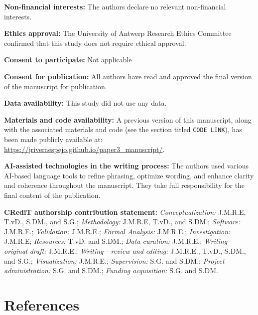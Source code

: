 \documentclass[
  authoryear,
  review,
  1p]{elsarticle}
\begin{document}
\textbf{Non-financial interests:} The authors declare no relevant
non-financial interests.

\textbf{Ethics approval:} The University of Antwerp Research Ethics
Committee confirmed that this study does not require ethical approval.

\textbf{Consent to participate:} Not applicable

\textbf{Consent for publication:} All authors have read and approved the
final version of the manuscript for publication.

\textbf{Data availability:} This study did not use any data.

\textbf{Materials and code availability:} A previous version of this
manuscript, along with the associated materials and code (see the
section titled \texttt{CODE\ LINK}), has been made publicly available
at: \url{https://jriveraespejo.github.io/paper3_manuscript/}.

\textbf{AI-assisted technologies in the writing process:} The authors
used various AI-based language tools to refine phrasing, optimize
wording, and enhance clarity and coherence throughout the manuscript.
They take full responsibility for the final content of the publication.

\textbf{CRediT authorship contribution statement:}
\emph{Conceptualization:} J.M.R.E, T.vD., S.DM., and S.G.;
\emph{Methodology:} J.M.R.E, T.vD., and S.DM.; \emph{Software:}
J.M.R.E.; \emph{Validation:} J.M.R.E.; \emph{Formal Analysis:} J.M.R.E.;
\emph{Investigation:} J.M.R.E; \emph{Resources:} T.vD. and S.DM.;
\emph{Data curation:} J.M.R.E.; \emph{Writing - original draft:}
J.M.R.E.; \emph{Writing - review and editing:} J.M.R.E., T.vD., S.DM.,
and S.G.; \emph{Visualization:} J.M.R.E.; \emph{Supervision:} S.G. and
S.DM.; \emph{Project administration:} S.G. and S.DM.; \emph{Funding
acquisition:} S.G. and S.DM.

\newpage{}

\newpage{}

\section*{References}\label{references}

\renewcommand{\bibsection}{}

\end{document}
